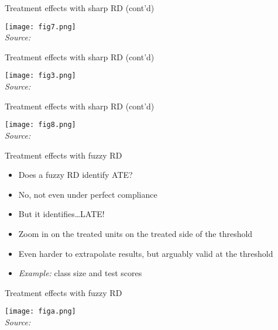 \documentclass[aspectratio=169,compress,handout,t,xcolor=table]{beamer}
\begin{document}
\begin{frame}{Treatment effects with sharp RD (cont'd)}
  \begin{center}
    \texttt{[image: fig7.png]} \\
    {\tiny \emph{Source:} \citet*{Lalive2008}}
  \end{center}
\end{frame}
\addtocounter{framenumber}{-1}

\begin{frame}{Treatment effects with sharp RD (cont'd)}
  \begin{center}
    \texttt{[image: fig3.png]} \\
    {\tiny \emph{Source:} \citet*{Lalive2008}}
  \end{center}
\end{frame}
\addtocounter{framenumber}{-1}

\begin{frame}{Treatment effects with sharp RD (cont'd)}
  \begin{center}
    \texttt{[image: fig8.png]} \\
    {\tiny \emph{Source:} \citet*{Lalive2008}}
  \end{center}
\end{frame}

\begin{frame}{Treatment effects with fuzzy RD}
  \begin{itemize}
    \item Does a fuzzy RD identify ATE?
    \item No, not even under perfect compliance
    \item But it identifies\ldots LATE!
    \item Zoom in on the treated units on the treated side of the threshold
    \item Even harder to extrapolate results, but arguably valid at the threshold
    \item \emph{Example:} class size and test scores \citep*[][QJE]{Angrist1999}
  \end{itemize}
\end{frame}
\addtocounter{framenumber}{-1}

\begin{frame}{Treatment effects with fuzzy RD}
  \begin{center}
    \texttt{[image: figa.png]} \\
    {\tiny \emph{Source:} \citet*{Angrist1999}}
  \end{center}
\end{frame}
\addtocounter{framenumber}{-1}
\end{document}
